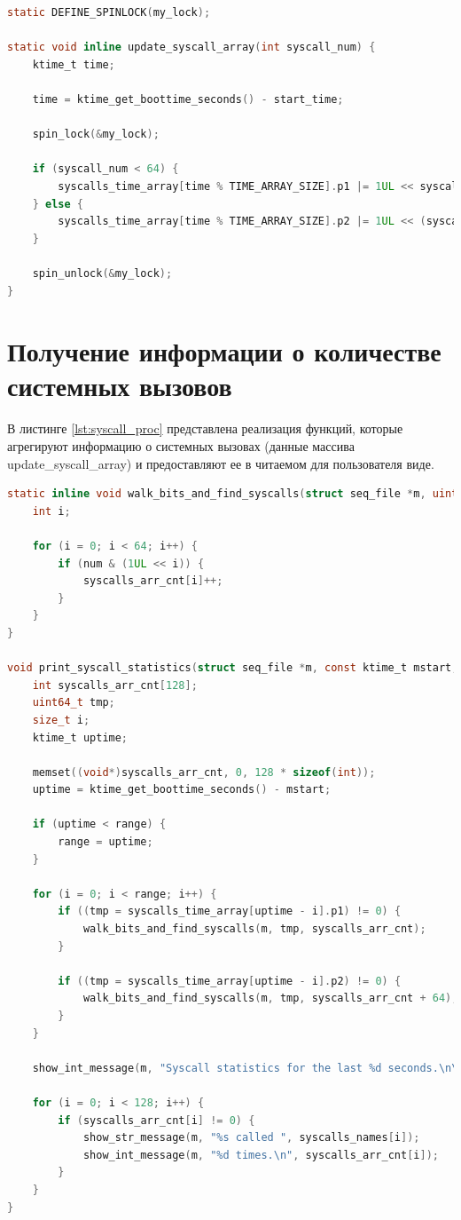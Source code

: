 \begin{lstlisting}[label=lst:update_syscall_array, caption=Реализация функции \texttt{update\_syscall\_array()}, language=c]
static DEFINE_SPINLOCK(my_lock);

static void inline update_syscall_array(int syscall_num) {
	ktime_t time;
	
	time = ktime_get_boottime_seconds() - start_time;
	
	spin_lock(&my_lock);
	
	if (syscall_num < 64) {
		syscalls_time_array[time % TIME_ARRAY_SIZE].p1 |= 1UL << syscall_num;
	} else {
		syscalls_time_array[time % TIME_ARRAY_SIZE].p2 |= 1UL << (syscall_num % 64);
	}
	
	spin_unlock(&my_lock);
}
\end{lstlisting}

\section{Получение информации о количестве системных вызовов}

В листинге \ref{lst:syscall_proc} представлена реализация функций, которые агрегируют информацию о системных вызовах (данные массива update\_syscall\_array) и предоставляют ее в читаемом для пользователя виде.\\

\begin{lstlisting}[label=lst:syscall_proc, caption=Реализация функций агрегации данных о системных вызовах, language=c]
static inline void walk_bits_and_find_syscalls(struct seq_file *m, uint64_t num, int syscalls_arr_cnt[]) {
	int i;
	
	for (i = 0; i < 64; i++) {
		if (num & (1UL << i)) {
			syscalls_arr_cnt[i]++;
		}
	}
}

void print_syscall_statistics(struct seq_file *m, const ktime_t mstart, ktime_t range) {
	int syscalls_arr_cnt[128];
	uint64_t tmp;
	size_t i;
	ktime_t uptime;
	
	memset((void*)syscalls_arr_cnt, 0, 128 * sizeof(int));
	uptime = ktime_get_boottime_seconds() - mstart;
	
	if (uptime < range) {
		range = uptime;
	}
	
	for (i = 0; i < range; i++) {
		if ((tmp = syscalls_time_array[uptime - i].p1) != 0) {
			walk_bits_and_find_syscalls(m, tmp, syscalls_arr_cnt);
		}
		
		if ((tmp = syscalls_time_array[uptime - i].p2) != 0) {
			walk_bits_and_find_syscalls(m, tmp, syscalls_arr_cnt + 64);
		}
	}
	
	show_int_message(m, "Syscall statistics for the last %d seconds.\n\n", range);
	
	for (i = 0; i < 128; i++) {
		if (syscalls_arr_cnt[i] != 0) {
			show_str_message(m, "%s called ", syscalls_names[i]);
			show_int_message(m, "%d times.\n", syscalls_arr_cnt[i]);
		}
	}
}
\end{lstlisting}

